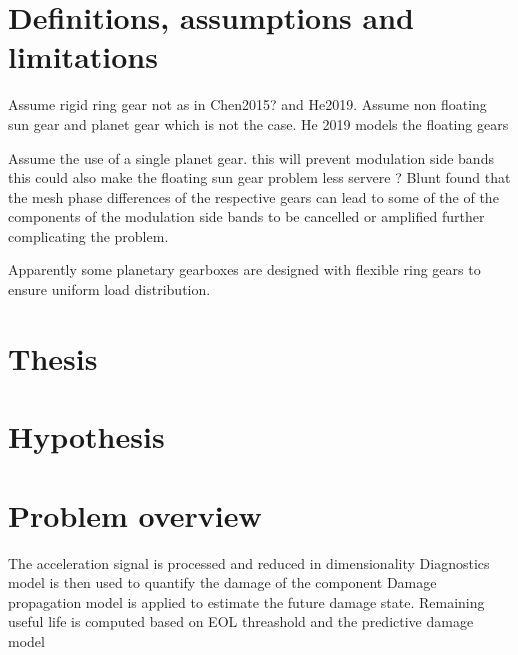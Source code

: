 \section{Definitions, assumptions and limitations}
Assume rigid ring gear not as in Chen2015? and He2019. Assume non floating sun gear and planet gear which is not the case. He 2019 models the floating gears

Assume the use of a single planet gear. this will prevent modulation side bands this could also make the floating sun gear problem less servere ?
Blunt found that the mesh phase differences of the respective gears can lead to some of the of the components of the modulation side bands to be cancelled or amplified further complicating the problem.

Apparently some planetary gearboxes are designed with flexible ring gears to ensure uniform load distribution.
\section{Thesis}

\section{Hypothesis}

\section{Problem overview}
The acceleration signal is processed and reduced in dimensionality
Diagnostics model is then used to quantify the damage of the component 
Damage propagation model is applied to estimate the future damage state. 
Remaining useful life is computed based on EOL threashold and the predictive damage model 
\cite{Ellis2019}

